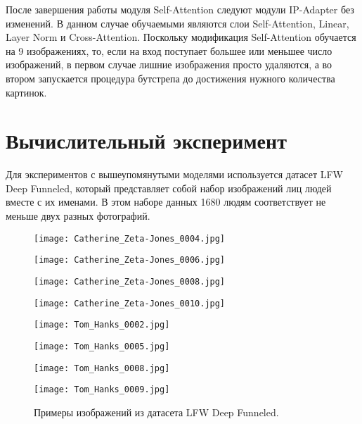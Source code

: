 \documentclass{article}
\begin{document}
После завершения работы модуля Self-Attention следуют модули IP-Adapter без изменений. В данном случае обучаемыми являются слои Self-Attention, Linear, Layer Norm и Cross-Attention. Поскольку модификация Self-Attention обучается на 9 изображениях, то, если на вход поступает большее или меньшее число изображений, в первом случае лишние изображения просто удаляются, а во втором запускается процедура бутстрепа до достижения нужного количества картинок.

\section{Вычислительный эксперимент}
Для экспериментов с вышеупомянутыми моделями используется датасет LFW Deep Funneled, который представляет собой набор изображений лиц людей вместе с их именами. В этом наборе данных 1680 людям соответствует не меньше двух разных фотографий. 

\begin{figure}[H]
\begin{minipage}{.25\textwidth}
    \centering
    \texttt{[image: Catherine\_Zeta-Jones\_0004.jpg]}
    \label{fig:1}
\end{minipage}%
\begin{minipage}{.25\textwidth}
    \centering
    \texttt{[image: Catherine\_Zeta-Jones\_0006.jpg]}
    \label{fig:2}
\end{minipage}%
\begin{minipage}{.25\textwidth}
    \centering
    \texttt{[image: Catherine\_Zeta-Jones\_0008.jpg]}
    \label{fig:3}
\end{minipage}%
\begin{minipage}{.25\textwidth}
    \centering
    \texttt{[image: Catherine\_Zeta-Jones\_0010.jpg]}
    \label{fig:4}
\end{minipage}%
\vspace{-12pt}
\begin{minipage}{.25\textwidth}
    \centering
    \texttt{[image: Tom\_Hanks\_0002.jpg]}
    \label{fig:11}
\end{minipage}%
\begin{minipage}{.25\textwidth}
    \centering
    \texttt{[image: Tom\_Hanks\_0005.jpg]}
    \label{fig:21}
\end{minipage}%
\begin{minipage}{.25\textwidth}
    \centering
    \texttt{[image: Tom\_Hanks\_0008.jpg]}
    \label{fig:31}
\end{minipage}%
\begin{minipage}{.25\textwidth}
    \centering
    \texttt{[image: Tom\_Hanks\_0009.jpg]}
    \label{fig:41}
\end{minipage}%
\caption{Примеры изображений из датасета LFW Deep Funneled.}
\end{figure}
\end{document}
